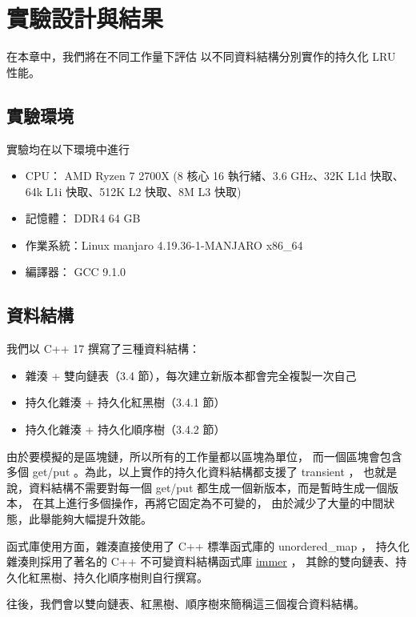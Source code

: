 \chapter{實驗設計與結果}
\label{c:experiment}

在本章中，我們將在不同工作量下評估
以不同資料結構分別實作的持久化 LRU 性能。

\section{實驗環境}
實驗均在以下環境中進行

\begin{itemize}
\item CPU： AMD Ryzen 7 2700X (8 核心 16 執行緒、3.6 GHz、32K L1d 快取、64k L1i 快取、512K L2 快取、8M L3 快取)
\item 記憶體： DDR4 64 GB
\item 作業系統：Linux manjaro 4.19.36-1-MANJARO x86\_64
\item 編譯器： GCC 9.1.0
\end{itemize}

\section{資料結構}

我們以 C++ 17 撰寫了三種資料結構：

\begin{itemize}
\item 雜湊 + 雙向鏈表（3.4 節），每次建立新版本都會完全複製一次自己
\item 持久化雜湊 + 持久化紅黑樹（3.4.1 節）
\item 持久化雜湊 + 持久化順序樹（3.4.2 節）
\end{itemize}

由於要模擬的是區塊鏈，所以所有的工作量都以區塊為單位，
而一個區塊會包含多個 get/put 。為此，以上實作的持久化資料結構都支援了 transient \cite{puente2017persistence}，
也就是說，資料結構不需要對每一個 get/put 都生成一個新版本，而是暫時生成一個版本，
在其上進行多個操作，再將它固定為不可變的，
由於減少了大量的中間狀態，此舉能夠大幅提升效能。

函式庫使用方面，雜湊直接使用了 C++ 標準函式庫的 unordered\_map ，
持久化雜湊則採用了著名的 C++ 不可變資料結構函式庫 \href{https://sinusoid.es/immer/}{immer} ，
其餘的雙向鏈表、持久化紅黑樹、持久化順序樹則自行撰寫。

往後，我們會以雙向鏈表、紅黑樹、順序樹來簡稱這三個複合資料結構。

